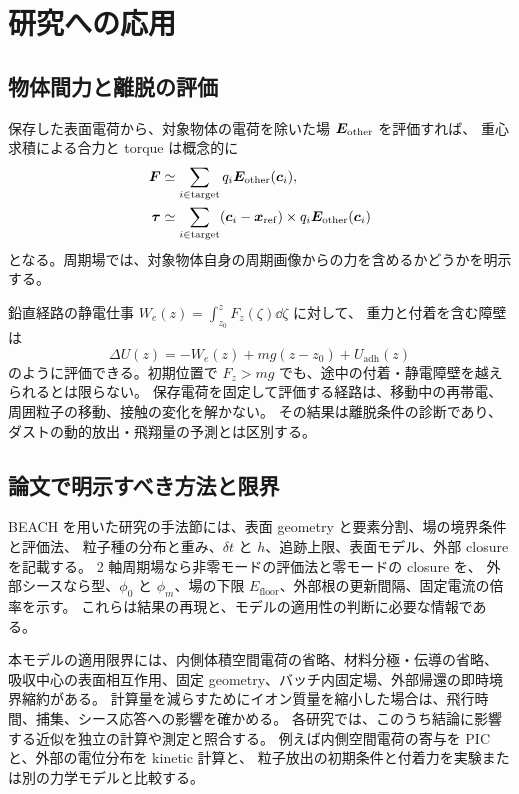 \chapter{研究への応用}
\label{ch:research}

\section{物体間力と離脱の評価}
保存した表面電荷から、対象物体の電荷を除いた場 $\bm{E}_{\mathrm{other}}$ を評価すれば、
重心求積による合力と torque は概念的に
\begin{align}
 \bm{F}&\simeq\sum_{i\in\mathrm{target}}q_i
                 \bm{E}_{\mathrm{other}}(\bm{c}_i),\\
 \bm{\tau}&\simeq\sum_{i\in\mathrm{target}}
       (\bm{c}_i-\bm{x}_{\mathrm{ref}})\times
       q_i\bm{E}_{\mathrm{other}}(\bm{c}_i)
\end{align}
となる。周期場では、対象物体自身の周期画像からの力を含めるかどうかを明示する。

鉛直経路の静電仕事 $W_e(z)=\int_{z_0}^{z}F_z(\zeta)\dd\zeta$ に対して、
重力と付着を含む障壁は
\begin{equation}
 \Delta U(z)=-W_e(z)+mg(z-z_0)+U_{\mathrm{adh}}(z)
\end{equation}
のように評価できる。初期位置で $F_z>mg$ でも、途中の付着・静電障壁を越えられるとは限らない。
保存電荷を固定して評価する経路は、移動中の再帯電、周囲粒子の移動、接触の変化を解かない。
その結果は離脱条件の診断であり、ダストの動的放出・飛翔量の予測とは区別する。

\section{論文で明示すべき方法と限界}
BEACH を用いた研究の手法節には、表面 geometry と要素分割、場の境界条件と評価法、
粒子種の分布と重み、$\delta t$ と $h$、追跡上限、表面モデル、外部 closure を記載する。
2 軸周期場なら非零モードの評価法と零モードの closure を、
外部シースなら型、$\phi_0$ と $\phi_m$、場の下限 $E_{\mathrm{floor}}$、外部根の更新間隔、固定電流の倍率を示す。
これらは結果の再現と、モデルの適用性の判断に必要な情報である。

本モデルの適用限界には、内側体積空間電荷の省略、材料分極・伝導の省略、
吸収中心の表面相互作用、固定 geometry、バッチ内固定場、外部帰還の即時境界縮約がある。
計算量を減らすためにイオン質量を縮小した場合は、飛行時間、捕集、シース応答への影響を確かめる。
各研究では、このうち結論に影響する近似を独立の計算や測定と照合する。
例えば内側空間電荷の寄与を PIC と、外部の電位分布を kinetic 計算と、
粒子放出の初期条件と付着力を実験または別の力学モデルと比較する。

